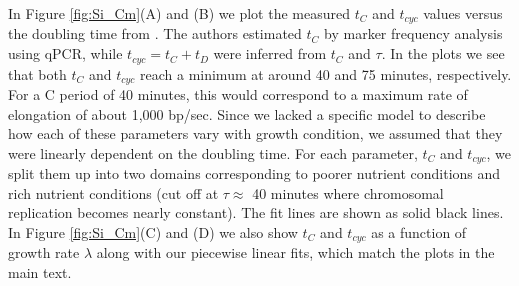 In Figure \ref{fig:Si_Cm}(A) and (B) we plot the measured $t_{C}$ and $t_{cyc}$
values versus the doubling time from \cite{si2017}. The authors estimated
$t_{C}$ by marker frequency analysis using qPCR, while  $t_{cyc} = t_{C} +
t_{D}$ were inferred from $t_{C}$ and $\tau$. In the plots we see that both
$t_{C}$ and $t_{cyc}$ reach a minimum  at around 40 and 75 minutes,
respectively. For a C period of 40 minutes, this would correspond to a maximum
rate of elongation of about 1,000 bp/sec. Since we lacked a specific model to
describe how each of these parameters vary with growth condition, we assumed
that they were linearly dependent on the doubling time. For each parameter,
$t_{C}$ and $t_{cyc}$, we split them up into two domains corresponding to poorer
nutrient conditions and rich nutrient conditions (cut off at $\tau \approx$ 40
minutes where chromosomal replication becomes nearly constant). The fit lines
are shown as solid black lines. In Figure \ref{fig:Si_Cm}(C) and (D) we also
show $t_{C}$ and $t_{cyc}$ as a function of growth rate $\lambda$ along with our
piecewise linear fits, which match the plots in the main text.


\begin{figure}
    \begin{fullwidth}
\end{fullwidth}
\end{figure}

